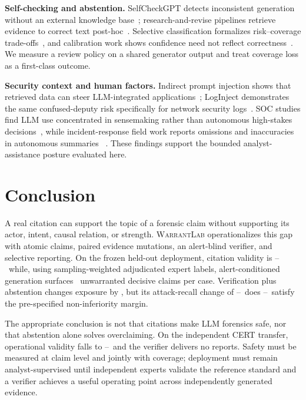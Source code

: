 \documentclass[letterpaper,twocolumn,10pt]{article}
\newcommand{\system}{\textsc{WarrantLab}\xspace}
\newcommand{\todoresult}{\textnormal{--}}
\newcommand{\AlertsUnsafeExposure}{\todoresult}
\newcommand{\AlertsCitationValidity}{\todoresult}
\newcommand{\UnsafeDifference}{\todoresult}
\newcommand{\RecallDifference}{\todoresult}
\newcommand{\NoninferiorResult}{\todoresult}
\newcommand{\ExternalOperationalValidity}{\todoresult}
\newif\ifconfidenceresults
\newcommand{\PrimaryWarrantBasis}{sampling-weighted adjudicated expert labels}
\newcommand{\PrimaryAlertsUnsafeExposure}{\HumanPrimaryAlertsUnsafeExposure}
\newcommand{\PrimaryUnsafeDifference}{\HumanPrimaryUnsafeDifference}
\newcommand{\PrimaryWarrantBasis}{the unvalidated mechanical proxy}
\newcommand{\PrimaryAlertsUnsafeExposure}{\AlertsUnsafeExposure}
\newcommand{\PrimaryUnsafeDifference}{\UnsafeDifference}
\begin{document}
\textbf{Self-checking and abstention.}  SelfCheckGPT detects inconsistent
generation without an external knowledge base~\cite{manakul2023selfcheckgpt};
research-and-revise pipelines retrieve evidence to correct text
post-hoc~\cite{gao2023rarr}.  Selective classification formalizes risk--coverage
trade-offs~\cite{elyaniv2010selective,franc2023reject}, and calibration work
shows confidence need not reflect correctness~\cite{guo2017calibration}.  We
measure a review policy on a shared generator output and treat coverage loss as
a first-class outcome.

\textbf{Security context and human factors.}  Indirect prompt injection shows
that retrieved data can steer LLM-integrated applications~\cite{greshake2023not};
LogInject demonstrates the same confused-deputy risk specifically for network
security logs~\cite{karanjai2026loginject}.
SOC studies find LLM use concentrated in sensemaking rather than autonomous
high-stakes decisions~\cite{singh2025llmsoc}, while incident-response field
work reports omissions and inaccuracies in autonomous summaries
~\cite{kramer2025sir}.  These findings support the bounded analyst-assistance
posture evaluated here.

\section{Conclusion}
\label{sec:conclusion}

A real citation can support the topic of a forensic claim without supporting
its actor, intent, causal relation, or strength.  \system operationalizes this
gap with atomic claims, paired evidence mutations, an alert-blind verifier, and
selective reporting.  On the frozen held-out deployment, citation validity is
\AlertsCitationValidity\ while, using \PrimaryWarrantBasis,
alert-conditioned generation surfaces \PrimaryAlertsUnsafeExposure\ unwarranted
decisive claims per case.  Verification plus abstention changes exposure by
\PrimaryUnsafeDifference, but its attack-recall change
of \RecallDifference\ does \NoninferiorResult\ satisfy the pre-specified
non-inferiority margin.
\ifconfidenceresults
Its confidence gate rejects no valid held-out output,
and mean confidence of \ConfidenceTestMean\ coexists with only
\ConfidenceTestExactRate\ exact verdict-plus-suspect correctness.
\fi
The
appropriate conclusion is not that citations make LLM forensics safe, nor that
abstention alone solves overclaiming.  On the
independent CERT transfer, operational validity falls to
\ExternalOperationalValidity\ and the verifier delivers no reports.  Safety
must be measured at claim level and jointly with coverage; deployment must
remain analyst-supervised until independent experts validate the reference
standard and a verifier achieves a useful operating point across independently
generated evidence.
\end{document}
